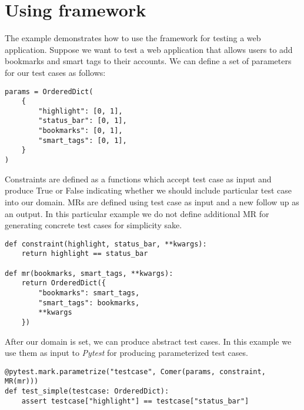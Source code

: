 \section{Using framework}

The example demonstrates how to use the framework for testing a web application. Suppose we want to test a web application that allows users to add bookmarks and smart tags to their accounts. We can define a set of parameters for our test cases as follows:

\begin{lstlisting}[label={lst:test-case2}]
params = OrderedDict(
	{
		"highlight": [0, 1],
		"status_bar": [0, 1],
		"bookmarks": [0, 1],
		"smart_tags": [0, 1],
	}
)
\end{lstlisting}

Constraints are defined as a functions which accept test case as input and produce True or False indicating whether we should include particular test case into our domain. MRs are defined using test case as input and a new follow up as an output. In this particular example we do not define additional MR for generating concrete test cases for simplicity sake.

\begin{lstlisting}[label={lst:test-case3}]
def constraint(highlight, status_bar, **kwargs):
	return highlight == status_bar

def mr(bookmarks, smart_tags, **kwargs):
	return OrderedDict({
		"bookmarks": smart_tags,
		"smart_tags": bookmarks,
		**kwargs
	})
\end{lstlisting}

After our domain is set, we can produce abstract test cases. In this example we use them as input to \textit{Pytest} for producing parameterized test cases.

\begin{lstlisting}[label={lst:test-case4}]
@pytest.mark.parametrize("testcase", Comer(params, constraint, MR(mr)))
def test_simple(testcase: OrderedDict):
	assert testcase["highlight"] == testcase["status_bar"]
\end{lstlisting}
